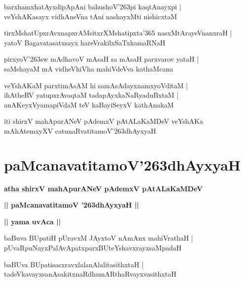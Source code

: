 \documentclass[twoside,12pt,openright]{book}
\def\S{\char'263}
\newcounter{shloka}[chapter]
\def\uvaca#1{\centerline{{\large\textbf{#1}}}}
\begin{document}
\begin{shloka}%
barxhamxhatAyxdipApAni bahushoV\S pi kaqtAnayxpi |\\
veYshAKasayx vidhAneVna tAni nashayxMti nishicxtaM 
\end{shloka}

\begin{shloka}%
tirxMshatUpxrAvxnapxrAMsitxrXMshatipxta\char'365 nasxMtArayeVnanxraH |\\
yatoV Bagavatasatxsayx hareVrakilxSaTxkamaRNaH 
\end{shloka}

\begin{shloka}%
pirxyoV\S sw mAdhavoV mAsaH sa mAsaH parxvarov yataH |\\
saMshayaM mA vidheVhiVha mahiVdeVva kathaMcana 
\end{shloka}

\begin{shloka}%
veYshAKaM parxtimAsAM hi samAsAdayxnamxyoVditaM |\\
ihAtheRV yatupxrAvaqtaM tadapAyxkaNaRyaduBxtaM |\\
anAKeyxVyamapiVdaM teV kaBayiSeyxV kathAnakaM 
\end{shloka}

\begin{center}
iti shirxV mahApurANeV pAdemxV pAtALaKaMDeV veYshAKa mAhAtemxyXV 
catunaRvatitamoV\S dhAyxyaH
\end{center}

\chapter{paMcanavatitamoV\S dhAyxyaH}

\begin{center}
{\LARGE\bfseries atha shirxV mahApurANeV pAdemxV pAtALaKaMDeV }
\end{center}

\begin{center}         
{\LARGE\bfseries || paMcanavatitamoV \S dhAyxyaH ||}
\end{center}

\uvaca{|| yama uvAca ||}

\begin{shloka}%
baBuva BUpatiH pUravxM JAyxtoV nAmAnx mahiVrathaH |\\
pUvaRpuNayxPalAvApatxparxBUteYshavxrayxsaMpadaH
\end{shloka}

\begin{shloka}%
baBUva BUpatisasxravxlalanAlalitasithxtaH |\\
tadeVkavayxsanAsakitxnaRdhamARthaRvayxvasithxtaH
\end{shloka}
\end{document}
